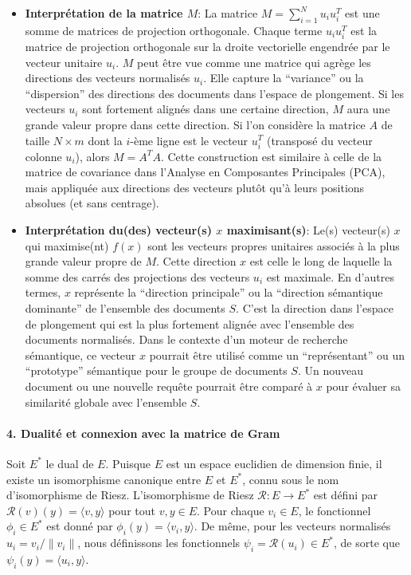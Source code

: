 \documentclass[11pt,a4paper]{report}
\begin{document}
\begin{itemize}
\item
  \textbf{Interprétation de la matrice \(M\)}: La matrice
  \(M = \sum_{i=1}^N u_i u_i^T\) est une somme de matrices de projection
  orthogonale. Chaque terme \(u_i u_i^T\) est la matrice de projection
  orthogonale sur la droite vectorielle engendrée par le vecteur
  unitaire \(u_i\). \(M\) peut être vue comme une matrice qui agrège les
  directions des vecteurs normalisés \(u_i\). Elle capture la
  ``variance'' ou la ``dispersion'' des directions des documents dans
  l'espace de plongement. Si les vecteurs \(u_i\) sont fortement alignés
  dans une certaine direction, \(M\) aura une grande valeur propre dans
  cette direction. Si l'on considère la matrice \(A\) de taille
  \(N \times m\) dont la \(i\)-ème ligne est le vecteur \(u_i^T\)
  (transposé du vecteur colonne \(u_i\)), alors \(M = A^T A\). Cette
  construction est similaire à celle de la matrice de covariance dans
  l'Analyse en Composantes Principales (PCA), mais appliquée aux
  directions des vecteurs plutôt qu'à leurs positions absolues (et sans
  centrage).
\item
  \textbf{Interprétation du(des) vecteur(s) \(x\) maximisant(s)}: Le(s)
  vecteur(s) \(x\) qui maximise(nt) \(f(x)\) sont les vecteurs propres
  unitaires associés à la plus grande valeur propre de \(M\). Cette
  direction \(x\) est celle le long de laquelle la somme des carrés des
  projections des vecteurs \(u_i\) est maximale. En d'autres termes,
  \(x\) représente la ``direction principale'' ou la ``direction
  sémantique dominante'' de l'ensemble des documents \(S\). C'est la
  direction dans l'espace de plongement qui est la plus fortement
  alignée avec l'ensemble des documents normalisés. Dans le contexte
  d'un moteur de recherche sémantique, ce vecteur \(x\) pourrait être
  utilisé comme un ``représentant'' ou un ``prototype'' sémantique pour
  le groupe de documents \(S\). Un nouveau document ou une nouvelle
  requête pourrait être comparé à \(x\) pour évaluer sa similarité
  globale avec l'ensemble \(S\).
\end{itemize}

\hypertarget{dualituxe9-et-connexion-avec-la-matrice-de-gram}{%
\paragraph{4. Dualité et connexion avec la matrice de
Gram}\label{dualituxe9-et-connexion-avec-la-matrice-de-gram}}

Soit \(E^*\) le dual de \(E\). Puisque \(E\) est un espace euclidien de
dimension finie, il existe un isomorphisme canonique entre \(E\) et
\(E^*\), connu sous le nom d'isomorphisme de Riesz. L'isomorphisme de
Riesz \(\mathcal{R}: E \to E^*\) est défini par
\(\mathcal{R}(v)(y) = \langle v, y \rangle\) pour tout \(v, y \in E\).
Pour chaque \(v_i \in E\), le fonctionnel \(\phi_i \in E^*\) est donné
par \(\phi_i(y) = \langle v_i, y \rangle\). De même, pour les vecteurs
normalisés \(u_i = v_i/\|v_i\|\), nous définissons les fonctionnels
\(\psi_i = \mathcal{R}(u_i) \in E^*\), de sorte que
\(\psi_i(y) = \langle u_i, y \rangle\).
\end{document}
